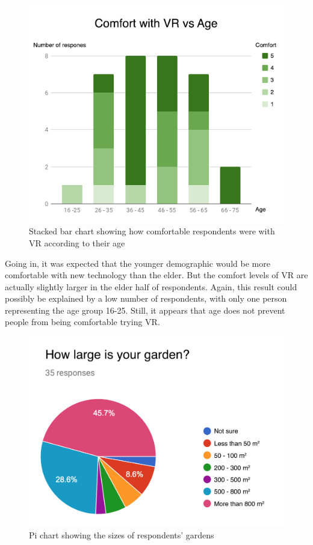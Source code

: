 			\begin{figure}[H]
				\centering
				\includegraphics[width=0.6\linewidth]{figure/Analysis/vrcomfort.png}
				\caption{Stacked bar chart showing how comfortable respondents were with VR according to their age}
				\label{fig:vrcomfort}
			\end{figure}
			
			Going in, it was expected that the younger demographic would be more comfortable with new technology than the elder. But the comfort levels of VR are actually slightly larger in the elder half of respondents. Again, this result could possibly be explained by a low number of respondents, with only one person representing the age group 16-25. Still, it appears that age does not prevent people from being comfortable trying VR.
			
			\begin{figure}[H]
				\centering
				\includegraphics[width=0.6\linewidth]{figure/Analysis/gardensize.png}
				\caption{Pi chart showing the sizes of respondents' gardens}
				\label{fig:gardensize}
			\end{figure}
			
